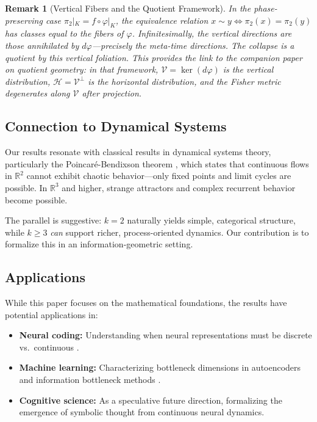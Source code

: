 \documentclass[12pt]{article}
\newtheorem{remark}[theorem]{Remark}
\newcommand{\R}{\mathbb{R}}
\begin{document}
\begin{remark}[Vertical Fibers and the Quotient Framework]\label{rem:fibers}
In the phase-preserving case $\pi_2|_K = f \circ \varphi|_K$, the equivalence relation $x \sim y \iff \pi_2(x) = \pi_2(y)$ has classes equal to the fibers of $\varphi$. Infinitesimally, the \emph{vertical} directions are those annihilated by $d\varphi$---precisely the meta-time directions. The collapse is a quotient by this vertical foliation. This provides the link to the companion paper on quotient geometry: in that framework, $\mathcal{V} = \ker(d\varphi)$ is the vertical distribution, $\mathcal{H} = \mathcal{V}^\perp$ is the horizontal distribution, and the Fisher metric degenerates along $\mathcal{V}$ after projection.
\end{remark}

\subsection{Connection to Dynamical Systems}

Our results resonate with classical results in dynamical systems theory, particularly the Poincar\'e-Bendixson theorem \citep{poincare1881memoire,bendixson1901courbes,guckenheimer1983nonlinear}, which states that continuous flows in $\R^2$ cannot exhibit chaotic behavior---only fixed points and limit cycles are possible. In $\R^3$ and higher, strange attractors and complex recurrent behavior become possible.

The parallel is suggestive: $k = 2$ naturally yields simple, categorical structure, while $k \geq 3$ \emph{can} support richer, process-oriented dynamics. Our contribution is to formalize this in an information-geometric setting.

\subsection{Applications}

While this paper focuses on the mathematical foundations, the results have potential applications in:

\begin{itemize}
    \item \textbf{Neural coding:} Understanding when neural representations must be discrete vs.\ continuous \citep{gallego2017neural}.
    \item \textbf{Machine learning:} Characterizing bottleneck dimensions in autoencoders and information bottleneck methods \citep{tishby2000information}.
    \item \textbf{Cognitive science:} As a speculative future direction, formalizing the emergence of symbolic thought from continuous neural dynamics.
\end{itemize}
\end{document}

